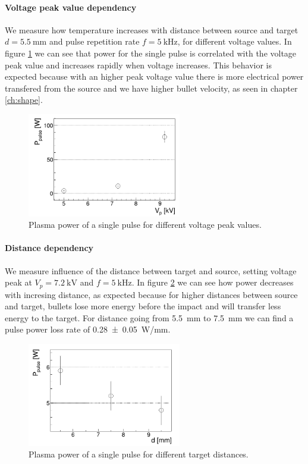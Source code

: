 \paragraph{Voltage peak value dependency}
We measure how temperature increases with distance between source and target $d = \SI{5.5}{\milli\meter}$ and pulse repetition rate $f = \SI{5}{\kilo\hertz}$, for different voltage values. In figure \ref{fig:PVp} we can see that power for the single pulse is correlated with the voltage peak value and increases rapidly when voltage increases. This behavior is expected because with an higher peak voltage value there is more electrical power transfered from the source and we have higher bullet velocity, as seen in chapter \ref{ch:shape}.
\begin{figure}
 \centering
 \includegraphics[width=0.6\textwidth]{Images/Temperature/Ppulse_Vp_2.png}
 \caption{Plasma power of a single pulse for different voltage peak values.}
 \label{fig:PVp}
\end{figure}

\paragraph{Distance dependency}
We measure influence of the distance between target and source, setting voltage peak at $V_{p} = \SI{7.2}{\kilo\volt}$ and $f = \SI{5}{\kilo\hertz}$. In figure \ref{fig:Pd} we can see how power decreases with incresing distance, as expected because for higher distances between source and target, bullets lose more energy before the impact and will transfer less energy to the target. For distance going from \SI{5.5}{\milli\meter} to \SI{7.5}{\milli\meter} we can find a pulse power loss rate of \SI{0.28(5)}{\watt/\milli\meter}.
\begin{figure}
 \centering
 \includegraphics[width=0.6\textwidth]{Images/Temperature/Ppulse_d_2.png}
 \caption{Plasma power of a single pulse for different target distances.}
 \label{fig:Pd}
\end{figure}
